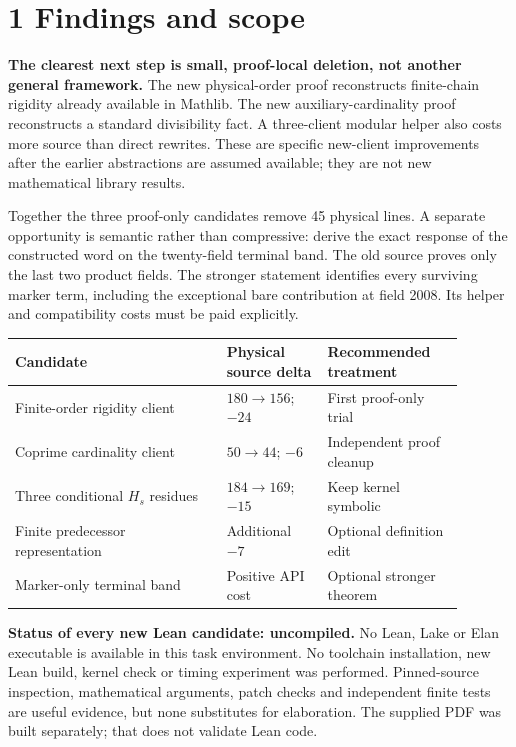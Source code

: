 \section*{1 Findings and scope}
\textbf{The clearest next step is small, proof-local deletion, not another general framework.} The new physical-order proof reconstructs finite-chain rigidity already available in Mathlib. The new auxiliary-cardinality proof reconstructs a standard divisibility fact. A three-client modular helper also costs more source than direct rewrites. These are specific new-client improvements after the earlier abstractions are assumed available; they are not new mathematical library results.

Together the three proof-only candidates remove 45 physical lines. A separate opportunity is semantic rather than compressive: derive the exact response of the constructed word on the twenty-field terminal band. The old source proves only the last two product fields. The stronger statement identifies every surviving marker term, including the exceptional bare contribution at field 2008. Its helper and compatibility costs must be paid explicitly.

\begin{tabular}{@{}L{0.42\linewidth}L{0.20\linewidth}L{0.27\linewidth}@{}}\toprule
Candidate & Physical source delta & Recommended treatment\\\midrule
Finite-order rigidity client & $180\to156$; $-24$ & First proof-only trial\\[4pt]
Coprime cardinality client & $50\to44$; $-6$ & Independent proof cleanup\\[4pt]
Three conditional $H_s$ residues & $184\to169$; $-15$ & Keep kernel symbolic\\[4pt]
Finite predecessor representation & Additional $-7$ & Optional definition edit\\[4pt]
Marker-only terminal band & Positive API cost & Optional stronger theorem\\\bottomrule
\end{tabular}

\textbf{Status of every new Lean candidate: uncompiled.} No Lean, Lake or Elan executable is available in this task environment. No toolchain installation, new Lean build, kernel check or timing experiment was performed. Pinned-source inspection, mathematical arguments, patch checks and independent finite tests are useful evidence, but none substitutes for elaboration. The supplied PDF was built separately; that does not validate Lean code.

